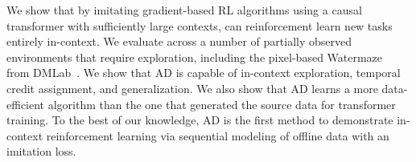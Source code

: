 We show that by imitating gradient-based RL algorithms using a causal transformer with sufficiently large contexts, \name can reinforcement learn new tasks entirely in-context. We evaluate \name across a number of partially observed environments that require exploration, including the pixel-based Watermaze~\citep{morris1981watermaze} from DMLab~\citep{beattie2016dmlab}. We show that AD is capable of in-context exploration, temporal credit assignment, and generalization. We also show that AD learns a more data-efficient algorithm than the one that generated the source data for transformer training.
To the best of our knowledge, AD is the first method to demonstrate in-context reinforcement learning via sequential modeling of offline data with an imitation loss.
